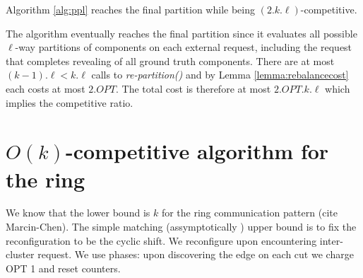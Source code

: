 \begin{theorem}	\label{thm:upperbound}
	Algorithm \ref{alg:ppl} reaches the final partition while being $(2.k.\ell)$-competitive.
\end{theorem}
\begin{IEEEproof}
	The algorithm eventually reaches the final partition since it
	 evaluates all possible $\ell$-way partitions of components on each external request,
	including the request that completes revealing of all ground truth components.
	There are at most $(k-1).\ell < k.\ell $ calls to \emph{re-partition()} and by Lemma \ref{lemma:rebalancecost} each costs at most $2.OPT$.
	The total cost is therefore at most $2.OPT.k.\ell$ which implies the competitive ratio.
      \end{IEEEproof}

      \section{$O(k)$-competitive algorithm for the ring}


      We know that the lower bound is $k$ for the ring communication pattern (cite Marcin-Chen).
      The simple matching (assymptotically ) upper bound is to fix the reconfiguration to be the cyclic shift. We reconfigure upon encountering inter-cluster request. We use phases: upon discovering the edge on each cut we charge OPT 1 and reset counters.